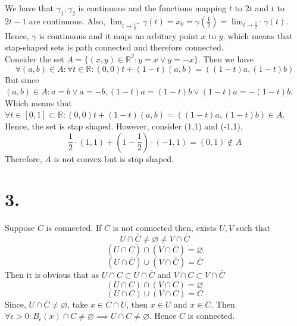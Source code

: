 \documentclass[11pt]{article}
\begin{document}
We have that $\gamma_1, \gamma_2$ is continuous and the functions mapping $t$ to $2t$ and $t$ to $2t-1$ are continuous.
Also, $\displaystyle{\lim_{t \to \frac{1}{2}^+}\gamma(t)} = x_0 = \gamma(\frac{1}{2}) = \displaystyle{\lim_{t \to \frac{1}{2}^-}\gamma(t)}$. Hence, $\gamma$ is continuous and it maps an arbitary point $x$ to $y$, which means that stap-shaped sets is path connected and therefore connected. \\
Consider the set $A = \{(x,y) \in \mathbb{R}^2: y = x \lor y = -x \}$. Then we have \\
\[\forall (a,b) \in A: \forall t \in \mathbb{R}: (0,0)t + (1-t)(a,b) = ((1-t)a, (1-t)b)\]
But since $(a,b) \in A: a = b \lor a = -b, (1-t)a = (1-t)b \lor (1-t)a = -(1-t)b$. Which means that $\forall t \in [0,1] \subset \mathbb{R}: (0,0)t + (1-t)(a,b) = ((1-t)a, (1-t)b) \in A$. Hence, the set is stap shaped.
However, consider (1,1) and (-1,1),
\[\frac{1}{2} \cdot (1,1) + (1-\frac{1}{2} ) \cdot (-1,1) = (0,1) \notin A\]
Therefore, $A$ is not convex but is stap shaped.  
\pagebreak
\section*{3.}
Suppose $C$ is connected. 
If $\overline{C}$ is not connected then, exists $U,V$ such that \\
\begin{equation} U \cap \overline{C} \ne \varnothing \ne V \cap  \overline{C} \end{equation}
\begin{equation}(U \cap  \overline{C}) \cap (V \cap  \overline{C}) = \varnothing\end{equation}
\begin{equation}(U \cap  \overline{C}) \cup (V \cap  \overline{C}) =  \overline{C}\end{equation}
Then it is obvious that as $U \cap C \subset U \cap \overline{C}$ and $V \cap C \subset V \cap \overline{C}$
\begin{equation}(U \cap C) \cap (V \cap  C) = \varnothing \end{equation}
\begin{equation}(U \cap  C) \cup (V \cap C) =  C\end{equation}
Since, $U \cap \overline{C} \ne \varnothing$, take $x \in \overline{C} \cap U$, then $x \in U$ and $x \in \overline{C}$. Then $\forall \epsilon >0: B_\epsilon(x) \cap C \ne \varnothing \implies U \cap C \ne \varnothing$. Hence $\overline{C}$ is connected.
\pagebreak
\end{document}
